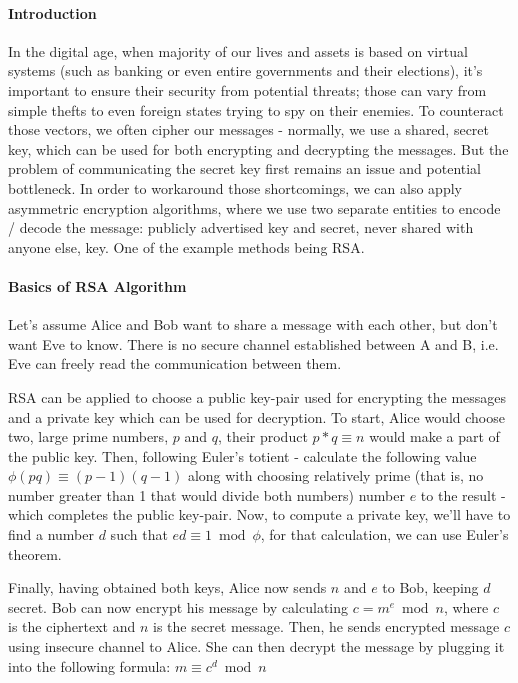 \documentclass[11pt]{article}
\author{Group Project 1 \\
  Konrad Dryja, 51552177 \\
  Alexandra Riddell, 123 \\
  Danah Alshuaib, 123 \\
  Ogtay Magsudov, 51662109 \\
  Daniel Rennie, 123 \\
  Waleed Totakhyl, 123}
\begin{document}
\maketitle
\begin{multicols}{2}

\paragraph{Introduction}
In the digital age, when majority of our lives and assets is based on virtual systems (such as banking or even entire governments and their elections), it's important to ensure their security from potential threats; those can vary from simple thefts to even foreign states trying to spy on their enemies. To counteract those vectors, we often cipher our messages - normally, we use a shared, secret key, which can be used for both encrypting and decrypting the messages. But the problem of communicating the secret key first remains an issue and potential bottleneck. In order to workaround those shortcomings, we can also apply asymmetric encryption algorithms, where we use two separate entities to encode / decode the message: publicly advertised key and secret, never shared with anyone else, key. One of the example methods being RSA.

\paragraph{Basics of RSA Algorithm}
Let's assume Alice and Bob want to share a message with each other, but don't want Eve to know. There is no secure channel established between A and B, i.e. Eve can freely read the communication between them.

RSA can be applied to choose a public key-pair used for encrypting the messages and a private key which can be used for decryption. To start, Alice would choose two, large prime numbers, $p$ and $q$, their product $p*q \equiv n$ would make a part of the public key. Then, following Euler's totient - calculate the following value $\phi(pq) \equiv (p-1)(q-1)$ along with choosing relatively prime (that is, no number greater than 1 that would divide both numbers) number $e$ to the result - which completes the public key-pair. Now, to compute a private key, we'll have to find a number $d$ such that \(ed \equiv 1 \bmod \phi\), for that calculation, we can use Euler's theorem.

Finally, having obtained both keys, Alice now sends $n$ and $e$ to Bob, keeping $d$ secret. Bob can now encrypt his message by calculating \(c = m^e \bmod n\), where $c$ is the ciphertext and $n$ is the secret message. Then, he sends encrypted message $c$ using insecure channel to Alice. She can then decrypt the message by plugging it into the following formula: $m \equiv c^d \bmod n$



\end{multicols}
\end{document}
